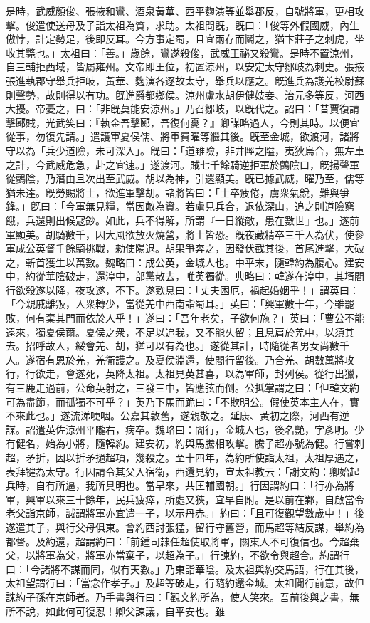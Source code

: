\begin{pinyinscope}
是時，武威顏俊、張掖和鸞、酒泉黃華、西平麴演等並舉郡反，自號將軍，更相攻擊。俊遣使送母及子詣太祖為質，求助。太祖問旣，旣曰：「俊等外假國威，內生傲悖，計定勢足，後即反耳。今方事定蜀，且宜兩存而鬬之，猶卞莊子之刺虎，坐收其斃也。」太祖曰：「善。」歲餘，鸞遂殺俊，武威王祕又殺鸞。是時不置涼州，自三輔拒西域，皆屬雍州。文帝即王位，初置涼州，以安定太守鄒岐為刺史。張掖張進執郡守舉兵拒岐，黃華、麴演各逐故太守，舉兵以應之。旣進兵為護羌校尉蘇則聲勢，故則得以有功。旣進爵都鄉侯。涼州盧水胡伊健妓妾、治元多等反，河西大擾。帝憂之，曰：「非旣莫能安涼州。」乃召鄒岐，以旣代之。詔曰：「昔賈復請擊郾賊，光武笑曰：『執金吾擊郾，吾復何憂？』卿謀略過人，今則其時。以便宜從事，勿復先請。」遣護軍夏侯儒、將軍費曜等繼其後。旣至金城，欲渡河，諸將守以為「兵少道險，未可深入」。旣曰：「道雖險，非井陘之隘，夷狄烏合，無左車之計，今武威危急，赴之宜速。」遂渡河。賊七千餘騎逆拒軍於鸇陰口，旣揚聲軍從鸇陰，乃潛由且次出至武威。胡以為神，引還顯美。旣已據武威，曜乃至，儒等猶未達。旣勞賜將士，欲進軍擊胡。諸將皆曰：「士卒疲倦，虜衆氣銳，難與爭鋒。」旣曰：「今軍無見糧，當因敵為資。若虜見兵合，退依深山，追之則道險窮餓，兵還則出候寇鈔。如此，兵不得解，所謂『一日縱敵，患在數世』也。」遂前軍顯美。胡騎數千，因大風欲放火燒營，將士皆恐。旣夜藏精卒三千人為伏，使參軍成公英督千餘騎挑戰，勑使陽退。胡果爭奔之，因發伏截其後，首尾進擊，大破之，斬首獲生以萬數。魏略曰：成公英，金城人也。中平末，隨韓約為腹心。建安中，約從華陰破走，還湟中，部黨散去，唯英獨從。典略曰：韓遂在湟中，其壻閻行欲殺遂以降，夜攻遂，不下。遂歎息曰：「丈夫困厄，禍起婚姻乎！」謂英曰：「今親戚離叛，人衆轉少，當從羌中西南詣蜀耳。」英曰：「興軍數十年，今雖罷敗，何有棄其門而依於人乎！」遂曰：「吾年老矣，子欲何施？」英曰：「曹公不能遠來，獨夏侯爾。夏侯之衆，不足以追我，又不能乆留；且息肩於羌中，以須其去。招呼故人，綏會羌、胡，猶可以有為也。」遂從其計，時隨從者男女尚數千人。遂宿有恩於羌，羌衞護之。及夏侯淵還，使閻行留後。乃合羌、胡數萬將攻行，行欲走，會遂死，英降太祖。太祖見英甚喜，以為軍師，封列侯。從行出獵，有三鹿走過前，公命英射之，三發三中，皆應弦而倒。公抵掌謂之曰：「但韓文約可為盡節，而孤獨不可乎？」英乃下馬而跪曰：「不欺明公。假使英本主人在，實不來此也。」遂流涕哽咽。公嘉其敦舊，遂親敬之。延康、黃初之際，河西有逆謀。詔遣英佐涼州平隴右，病卒。魏略曰：閻行，金城人也，後名艷，字彥明。少有健名，始為小將，隨韓約。建安初，約與馬騰相攻擊。騰子超亦號為健。行嘗刺超，矛折，因以折矛撾超項，幾殺之。至十四年，為約所使詣太祖，太祖厚遇之，表拜犍為太守。行因請令其父入宿衞，西還見約，宣太祖教云：「謝文約：卿始起兵時，自有所逼，我所具明也。當早來，共匡輔國朝。」行因謂約曰：「行亦為將軍，興軍以來三十餘年，民兵疲瘁，所處又狹，宜早自附。是以前在鄴，自啟當令老父詣京師，誠謂將軍亦宜遣一子，以示丹赤。」約曰：「且可復觀望數歲中！」後遂遣其子，與行父母俱東。會約西討張猛，留行守舊營，而馬超等結反謀，舉約為都督。及約還，超謂約曰：「前鍾司隷任超使取將軍，關東人不可復信也。今超棄父，以將軍為父，將軍亦當棄子，以超為子。」行諫約，不欲令與超合。約謂行曰：「今諸將不謀而同，似有天數。」乃東詣華陰。及太祖與約交馬語，行在其後，太祖望謂行曰：「當念作孝子。」及超等破走，行隨約還金城。太祖聞行前意，故但誅約子孫在京師者。乃手書與行曰：「觀文約所為，使人笑來。吾前後與之書，無所不說，如此何可復忍！卿父諫議，自平安也。雖
\end{pinyinscope}
